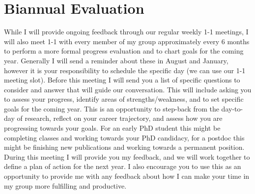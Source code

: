 \documentclass{classassignments}
\begin{document}
\section{Biannual Evaluation}\label{sec:Yearly}
While I will provide ongoing feedback through our regular weekly 1-1 meetings, I will also meet 1-1 with every member of my group approximately every 6 months to perform a more formal progress evaluation and to chart goals for the coming year. Generally I will send a reminder about these in August and January, however it is your responsibility to schedule the specific day (we can use our 1-1 meeting slot). Before this meeting I will send you a list of specific questions to consider and answer that will guide our conversation. This will include asking you to assess your progress, identify areas of strengths/weakness, and to set specific goals for the coming year. This is an opportunity to step-back from the day-to-day of research, reflect on your career trajectory, and assess how you are progressing towards your goals. For an early PhD student this might be completing classes and working towards your PhD candidacy, for a postdoc this might be finishing new publications and working towards a permanent position. During this meeting I will provide you my feedback, and we will work together to define a plan of action for the next year. I also encourage you to use this as an opportunity to provide me with any feedback about how I can make your time in my group more fulfilling and productive. 

%
%
\end{document}
